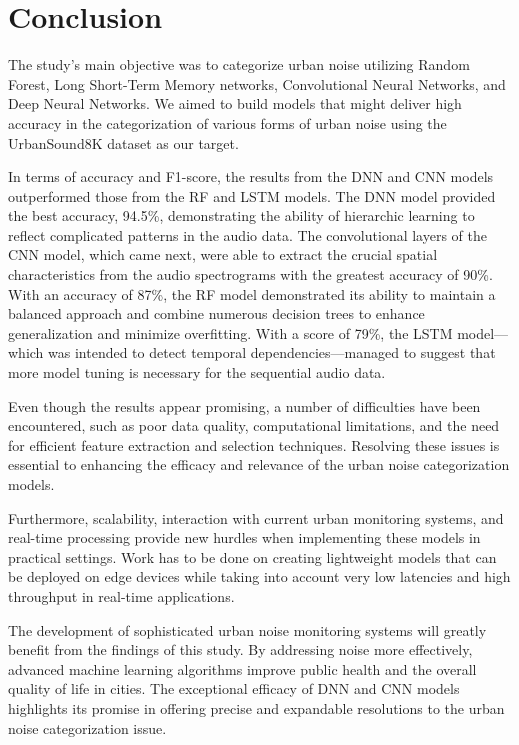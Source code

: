 \documentclass[conference]{IEEEtran}
\begin{document}
\section{Conclusion}

The study's main objective was to categorize urban noise utilizing Random Forest, Long Short-Term Memory networks, Convolutional Neural Networks, and Deep Neural Networks. We aimed to build models that might deliver high accuracy in the categorization of various forms of urban noise using the UrbanSound8K dataset as our target.


In terms of accuracy and F1-score, the results from the DNN and CNN models outperformed those from the RF and LSTM models. The DNN model provided the best accuracy, 94.5\%, demonstrating the ability of hierarchic learning to reflect complicated patterns in the audio data. The convolutional layers of the CNN model, which came next, were able to extract the crucial spatial characteristics from the audio spectrograms with the greatest accuracy of 90\%. With an accuracy of 87\%, the RF model demonstrated its ability to maintain a balanced approach and combine numerous decision trees to enhance generalization and minimize overfitting. With a score of 79\%, the LSTM model—which was intended to detect temporal dependencies—managed to suggest that more model tuning is necessary for the sequential audio data.


Even though the results appear promising, a number of difficulties have been encountered, such as poor data quality, computational limitations, and the need for efficient feature extraction and selection techniques. Resolving these issues is essential to enhancing the efficacy and relevance of the urban noise categorization models.

Furthermore, scalability, interaction with current urban monitoring systems, and real-time processing provide new hurdles when implementing these models in practical settings. Work has to be done on creating lightweight models that can be deployed on edge devices while taking into account very low latencies and high throughput in real-time applications.


The development of sophisticated urban noise monitoring systems will greatly benefit from the findings of this study. By addressing noise more effectively, advanced machine learning algorithms improve public health and the overall quality of life in cities. The exceptional efficacy of DNN and CNN models highlights its promise in offering precise and expandable resolutions to the urban noise categorization issue.
\end{document}
